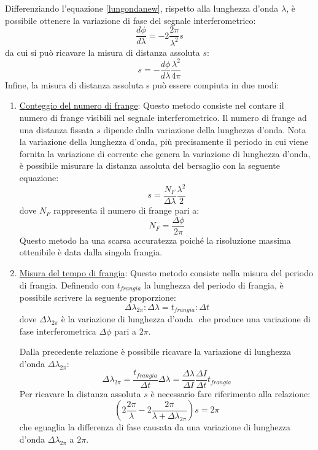 Differenziando l'equazione \ref{lungondanew}, rispetto alla lunghezza d'onda $\lambda$, è possibile ottenere la variazione di fase del segnale interferometrico:
\begin{equation}
	\frac{d\phi}{d\lambda}=-2\frac{2\pi}{\lambda^2}s
\end{equation}
da cui si può ricavare la misura di distanza assoluta $s$:
\begin{equation}
	s=-\frac{d\phi}{d\lambda}\frac{\lambda^2}{4\pi}
\end{equation}
Infine, la misura di distanza assoluta s può essere compiuta in due modi:
\begin{enumerate}
	\item \underline{Conteggio del numero di frange}: Questo metodo consiste nel contare il numero di frange visibili nel segnale interferometrico. Il numero di frange ad una distanza fissata $s$ dipende dalla variazione della lunghezza d'onda. Nota la variazione della lunghezza d'onda, più precisamente il periodo in cui viene fornita la variazione di corrente che genera la variazione di lunghezza d'onda, è possibile misurare la distanza assoluta del bersaglio con la seguente equazione:
	\begin{equation}
		s=\frac{N_F}{\Delta \lambda}\frac{\lambda^2}{2}
	\end{equation}
	dove $N_F$ rappresenta il numero di frange pari a:
	\begin{equation}
		N_F=\frac{\Delta \phi}{2 \pi}
	\end{equation}
	Questo metodo ha una scarsa accuratezza poiché la risoluzione massima ottenibile è data dalla singola frangia. 
	\item \underline{Misura del tempo di frangia}: Questo metodo consiste nella misura del periodo di frangia. Definendo con $t_{frangia}$ la lunghezza del periodo di frangia, è possibile scrivere la seguente proporzione:
	\begin{equation}
		\Delta \lambda_{2\pi} : \Delta \lambda = t_{frangia} : \Delta t
	\end{equation}
	dove $\Delta \lambda_{2\pi}$ è la variazione di lunghezza d'onda  che produce una variazione di fase interferometrica $\Delta \phi$ pari a $2\pi$.
	
	Dalla precedente relazione è possibile ricavare la variazione di lunghezza d'onda $\Delta \lambda_{2\pi}$:
	\begin{equation}
		\Delta \lambda_{2\pi} = \frac{t_{frangia}}{\Delta t} \Delta \lambda = \frac{\Delta \lambda}{\Delta I}\frac{\Delta I}{\Delta t} t_{frangia}
	\end{equation}
	Per ricavare la distanza assoluta $s$ è necessario fare riferimento alla relazione:
	\begin{equation}
		\left ( 2\frac{2\pi}{\lambda}-2\frac{2\pi}{\lambda + \Delta \lambda_{2\pi}} \right ) s = 2\pi
	\end{equation}
	che eguaglia la differenza di fase causata da una variazione di lunghezza d'onda $\Delta \lambda_{2\pi}$ a $2\pi$.
	

\end{enumerate}
